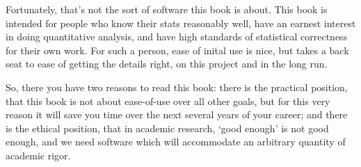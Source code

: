 Fortunately, that's not the sort of software this book is about.
This book is intended for people who know their stats reasonably well,
have an earnest interest in doing quantitative analysis, and have
high standards of statistical correctness for their own work. For such a
person, ease of inital use is nice, but takes a back seat to ease of
getting the details right, on this project and in the long run.

So, there you have two reasons to read this book: there is the practical
position, that this book is not about ease-of-use over all other goals,
but for this very reason it will save you time over the next several
years of your career; and there is the ethical position, that in academic
research, `good enough' is not good enough, and we need software which
will accommodate an arbitrary quantity of academic rigor.

